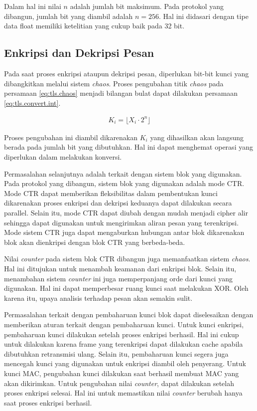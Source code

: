 Dalam hal ini nilai $n$ adalah jumlah bit maksimum. Pada protokol yang dibangun, jumlah bit yang diambil adalah $n = 256$. Hal ini didasari dengan tipe data float memiliki ketelitian yang cukup baik pada 32 bit.

\subsection{Enkripsi dan Dekripsi Pesan}

Pada saat proses enkripsi ataupun dekripsi pesan, diperlukan bit-bit kunci yang dibangkitkan melalui sistem \emph{chaos}. Proses pengubahan titik \emph{chaos} pada persamaan \ref{eq:tls.chaos} menjadi bilangan bulat dapat dilakukan persamaan \ref{eq:tls.convert.int}.

\begin{equation}
  \begin{aligned}
    K_i = \lfloor{X_i \cdot 2^{n}}\rfloor
  \end{aligned}
  \label{eq:tls.convert.int}
\end{equation}

Proses pengubahan ini diambil dikarenakan $K_i$ yang dihasilkan akan langsung berada pada jumlah bit yang dibutuhkan. Hal ini dapat menghemat operasi yang diperlukan dalam melakukan konversi.

Permasalahan selanjutnya adalah terkait dengan sistem blok yang digunakan. Pada protokol yang dibangun, sistem blok yang digunakan adalah mode CTR. Mode CTR dapat memberikan fleksibilitas dalam pembentukan kunci dikarenakan proses enkripsi dan dekripsi keduanya dapat dilakukan secara parallel. Selain itu, mode CTR dapat diubah dengan mudah menjadi cipher alir sehingga dapat digunakan untuk mengirimkan aliran pesan yang terenkripsi. Mode sistem CTR juga dapat mengaburkan hubungan antar blok dikarenakan blok akan dienkripsi dengan blok CTR yang berbeda-beda.

Nilai \emph{counter} pada sistem blok CTR dibangun juga memanfaatkan sistem \emph{chaos}. Hal ini ditujukan untuk menambah keamanan dari enkripsi blok. Selain itu, menambahan sistem \emph{counter} ini juga memperpanjang orde dari kunci yang digunakan. Hal ini dapat memperbesar ruang kunci saat melakukan XOR. Oleh karena itu, upaya analisis terhadap pesan akan semakin sulit.

Permasalahan terkait dengan pembaharuan kunci blok dapat diselesaikan dengan memberikan aturan terkait dengan pembaharuan kunci. Untuk kunci enkripsi, pembaharuan kunci dilakukan setelah proses enkripsi berhasil. Hal ini cukup untuk dilakukan karena frame yang terenkripsi dapat dilakukan cache apabila dibutuhkan retransmisi ulang. Selain itu, pembaharuan kunci segera juga mencegah kunci yang digunakan untuk enkripsi diambil oleh penyerang. Untuk kunci MAC, pengubahan kunci dilakukan saat berhasil membuat MAC yang akan dikirimkan. Untuk pengubahan nilai \emph{counter}, dapat dilakukan setelah proses enkripsi selesai. Hal ini untuk memastikan nilai \emph{counter} berubah hanya saat proses enkripsi berhasil.


